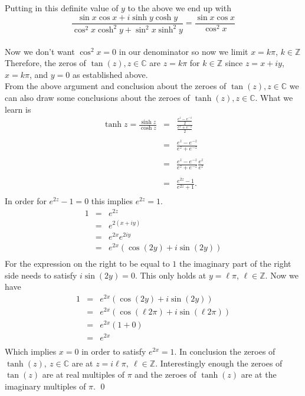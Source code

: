 \documentclass[10pt]{amsart}
\theoremstyle{nonumberplain}
\begin{document}
\begin{enumerate}[label={\bf {\arabic*}:}]
Putting in this definite value of $y$ to the above we end up with \\
$$\frac{\sin x \cos x + i \sinh y \cosh y} {\cos^2 x \cosh^2 y  + \sin^2 x \sinh^2 y } = \frac{\sin x \cos x} {\cos^2 x}$$ \\
Now we don't want $\cos^2x = 0$ in our denominator so now we limit $x = k\pi$, $k \in \mathbb{Z}$
Therefore, the zeros of $\tan (z), z \in \mathbb{C}$ are $z = k\pi$ for $k \in \mathbb{Z}$ since $z = x + iy$, $x = k\pi$, and $y = 0$ as established above.\\

\noindent
From the above argument and conclusion about the zeroes of $\tan (z), z \in \mathbb{C}$ we can also draw some conclusions about the zeroes of $\tanh (z), z \in \mathbb{C}$.
What we learn is
\begin{eqnarray*}
\tanh z = \frac{\sinh z}{\cosh z} &=& \frac{\frac{e^z - e^{-z}}{2}}{\frac{e^z + e^{-z}}{2}} \\ \\
 					       &=& \frac{e^z - e^{-z}}{e^z + e^{-z}} \\ \\
					       &=& \frac{e^z - e^{-z}}{e^z + e^{-z}} \frac{e^z}{e^z} \\ \\
					       &=& \frac{e^{2z} -  1}{e^{2z} + 1}. \\
\end{eqnarray*}
In order for $e^{2z} -  1 = 0$ this implies $e^{2z} = 1$.
\begin{eqnarray*}
1 &=& e^{2z} \\
   &=& e^{2(x + iy)} \\
   &=& e^{2x}e^{2iy} \\
   &=& e^{2x}(\cos(2y) + i \sin(2y)) \\
\end{eqnarray*}
For the expression on the right to be equal to $1$ the imaginary part of the right side needs to satisfy $i \sin(2y) = 0$.
This only holds at $y = \ell \pi$, $\ell \in \mathbb{Z}$.
Now we have 
\begin{eqnarray*}
1 &=& e^{2x}(\cos(2y) + i \sin(2y)) \\
   &=& e^{2x}(\cos(\ell 2\pi) + i \sin(\ell 2 \pi)) \\
   &=& e^{2x}(1 + 0) \\
   &=& e^{2x} \\
\end{eqnarray*}
Which implies $x = 0$ in order to satisfy $ e^{2x} = 1$.
In conclusion the zeroes of $\tanh(z), \: z \in \mathbb{C}$ are at $ z = i \ell \pi, \: \ell \in \mathbb{Z}$. Interestingly enough the zeroes of $\tan(z)$ are at real multiples of $\pi$ and the zeroes of $\tanh(z)$ are at the imaginary multiples of $\pi$.
\qed
\\


\end{enumerate}
\end{document}
